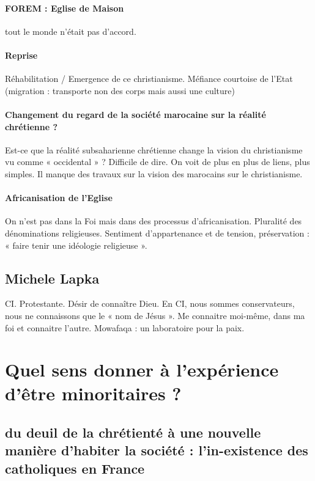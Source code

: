 \paragraph{FOREM : Eglise de Maison} tout le monde n’était pas d’accord.

\paragraph{Reprise}
Réhabilitation / Emergence de ce christianisme. Méfiance courtoise de l’Etat (migration : transporte non des corps mais aussi une culture)

\paragraph{Changement du regard de la société marocaine sur la réalité chrétienne ?} Est-ce que la réalité subsaharienne chrétienne change la vision du christianisme vu comme « occidental » ? Difficile de dire.  On voit de plus en plus de liens, plus simples. Il manque des travaux sur la vision des marocains sur le christianisme. 		

\paragraph{Africanisation de l’Eglise} On n’est pas dans la Foi mais dans des processus d’africanisation.  Pluralité des dénominations religieuses. Sentiment d’appartenance et de tension, préservation : « faire tenir une idéologie religieuse ». 				
\subsection{Michele Lapka} CI. Protestante. Désir de connaître Dieu. En CI, nous sommes conservateurs, nous ne connaissons que le « nom de Jésus ». Me connaitre moi-même, dans ma foi et connaitre l’autre. Mowafaqa : un laboratoire pour la paix. 

\section{ Quel sens donner à l’expérience d’être minoritaires ?}
 

\subsection{du deuil de la chrétienté à une nouvelle manière d’habiter la société : l’in-existence des catholiques en France}

